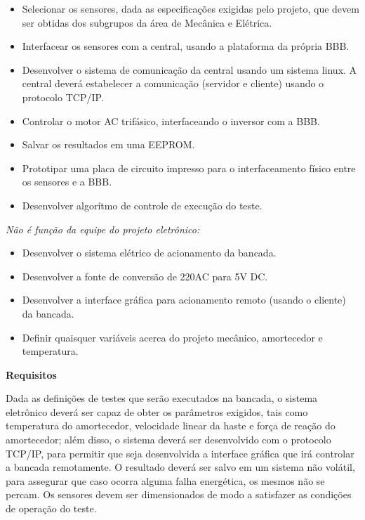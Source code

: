 	\begin{itemize}

		\item Selecionar os sensores, dada as especificações exigidas pelo projeto, que devem ser obtidas dos subgrupos da área de Mecânica e Elétrica.
		\item Interfacear os sensores com a central, usando a plataforma da própria BBB.
		\item Desenvolver o sistema de comunicação da central usando um sistema linux. A central deverá estabelecer a comunicação (servidor e cliente) usando o protocolo TCP/IP.
		\item Controlar o motor AC trifásico, interfaceando o inversor com a BBB.
		\item Salvar os resultados em uma EEPROM.
		\item Prototipar uma placa de circuito impresso para o interfaceamento físico entre os sensores e a BBB.
		\item Desenvolver algorítmo de controle de execução do teste.

	\end{itemize}

	\textit{ Não é função da equipe do projeto eletrônico:}

	\begin{itemize}

		\item Desenvolver o sistema elétrico de acionamento da bancada.
		\item Desenvolver a fonte de conversão de 220AC para 5V DC.
		\item Desenvolver a interface gráfica para acionamento remoto (usando o cliente) da bancada.
		\item Definir quaisquer variáveis acerca do projeto mecânico, amortecedor e temperatura.

	\end{itemize}

	\textbf{Requisitos}

	Dada as definições de testes que serão executados na bancada, o sistema eletrônico deverá ser capaz de obter os parâmetros exigidos, tais como temperatura do amortecedor, velocidade linear da haste e força de reação do amortecedor; além disso, o sistema deverá ser desenvolvido com o protocolo TCP/IP, para permitir que seja desenvolvida a interface gráfica que irá controlar a bancada remotamente. O resultado deverá ser salvo em um sistema não volátil, para assegurar que caso ocorra alguma falha energética, os mesmos não se percam. Os sensores devem ser dimensionados de modo a satisfazer as condições de operação do teste. 

